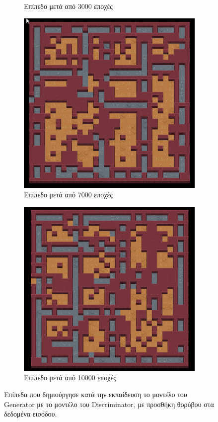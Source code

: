 \begin{figure}[H]
\begin{subfigure}{.5\textwidth}
  \caption{Επίπεδο μετά από 3000 εποχές}
  \label{fig:sfig2}
\end{subfigure}
\begin{subfigure}{.5\textwidth}
  \centering
  \includegraphics[width=.8\linewidth]{../images/result_images/cnn-gan-with-fuzzy/combined_7000.png}
  \caption{Επίπεδο μετά από 7000 εποχές}
  \label{fig:sfig2}
\end{subfigure}
\begin{subfigure}{.5\textwidth}
  \centering
  \includegraphics[width=.8\linewidth]{../images/result_images/cnn-gan-with-fuzzy/combined_10000.png}
  \caption{Επίπεδο μετά από 10000 εποχές}
  \label{fig:sfig2}
\end{subfigure}
\caption{Επίπεδα που δημιούργησε κατά την εκπαίδευση το μοντέλο του Generator με το μοντέλο του Discriminator, με προσθήκη θορύβου στα δεδομένα εισόδου.}
\label{fig:fig}
\end{figure}

